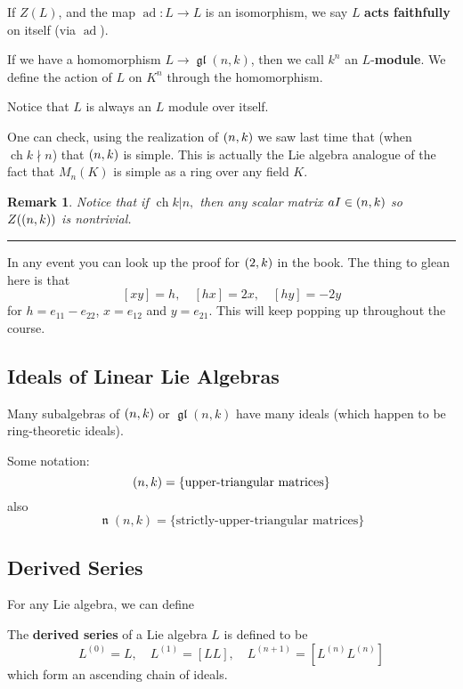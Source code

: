 \documentclass[12pt]{article}
\theoremstyle{nonumberbreak}
\theoremstyle{changebreak}
\theoremstyle{nonumberbreak}
\theoremstyle{change}
\newtheorem{rmk}[thm]{Remark}
\newcommand*{\brk}{
\rule{2in}{.1pt}
}
\DeclareMathOperator{\ch}{ch}
\DeclareMathOperator{\gl}{\mathfrak{gl}}
\let\sl\relax
\DeclareMathOperator{\sl}{\mathfrak{sl}}
\DeclareMathOperator{\ad}{ad}
\let\t\relax
\DeclareMathOperator{\t}{\mathfrak{t}}
\DeclareMathOperator{\n}{\mathfrak{n}}
\begin{document}
\begin{defn}
	If $Z(L)$, and the map $\ad:L\to L$ is an isomorphism, we say $L$ \textbf{acts faithfully}
	on itself (via $\ad$).
\end{defn}

\begin{defn}
	If we have a homomorphism $L\to\gl(n,k)$, then we call $k^n$ an $L$-\textbf{module}.
	We define the action of $L$ on $K^n$ through the homomorphism.
\end{defn}

Notice that $L$ is always an $L$ module over itself.

One can check, using the realization of $\sl(n,k)$ we saw last time that (when $\ch k\nmid n$)
that $\sl(n,k)$ is simple. This is actually the Lie algebra analogue of the fact that $M_n(K)$ is simple
as a ring over any field $K$.

\begin{rmk}
	Notice that if $\ch k |n$$,$ then \textit{any} scalar matrix $aI\in\sl(n,k)$
	so $Z(\sl(n,k))$ is nontrivial.
\end{rmk}

\brk

In any event you can look up the proof for $\sl(2,k)$ in the book. The thing to glean here is that
\[[xy]=h,\quad [hx]=2x,\quad [hy]=-2y\]
for $h=e_{11}-e_{22}$, $x=e_{12}$ and $y=e_{21}$. This will keep popping up throughout the course.

\subsection{Ideals of Linear Lie Algebras}
Many subalgebras of $\sl(n,k)$ or $\gl(n,k)$ have many ideals (which happen to be ring-theoretic ideals).

\begin{defn}
	Some notation:
	\[\t(n,k)=\{\text{upper-triangular matrices}\}\] 
	also 
	\[\n(n,k)=\{\text{strictly-upper-triangular matrices}\}\]
\end{defn}

\subsection{Derived Series}
For any Lie algebra, we can define
\begin{defn}
	The \textbf{derived series} of a Lie algebra $L$ is defined to be
	\[L^{(0)}=L,\quad L^{(1)}=[LL],\quad L^{(n+1)}=[L^{(n)}L^{(n)}]\]
	which form an ascending chain of ideals.
\end{defn}
\end{document}
